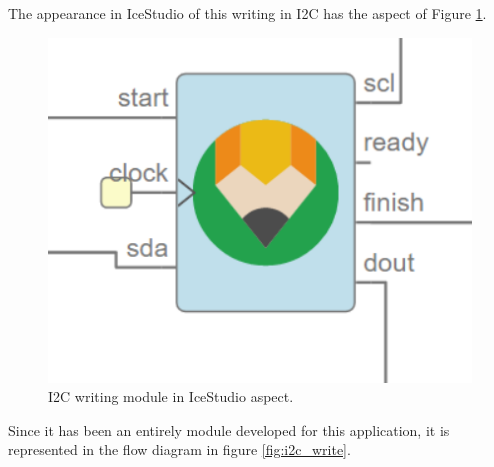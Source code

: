 The appearance in IceStudio of this writing in I2C has the aspect of Figure \ref{fig:I2C_write}.
\begin{figure}[H]
	\center
	\includegraphics[scale=0.4, angle=0]{imagenes/Cuadricoptero_vision/I2C_write.PNG}
	\caption{I2C writing module in IceStudio aspect.}
	\label{fig:I2C_write}
\end{figure}

Since it has been an entirely module developed for this application, it is represented in the flow diagram in figure \ref{fig:i2c_write}.

